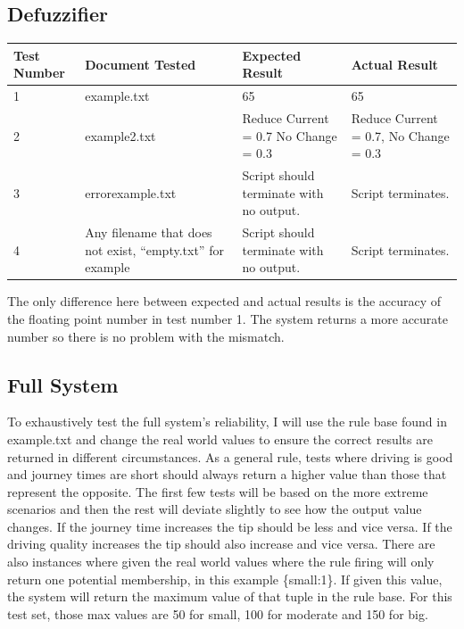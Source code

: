 \documentclass{article}
\begin{document}
\subsection{Defuzzifier}
\begin{center}
 \begin{tabular}{ |p{2cm}|p{3cm}|p{3cm}|p{3cm}|  }
 \hline
 Test Number & Document Tested & Expected Result & Actual Result \\ [0.5ex] 
 \hline\hline
 1 & example.txt & 65 & 65 \\ 
 \hline
 2 & example2.txt & Reduce Current = 0.7 \newline No Change = 0.3 & Reduce Current = 0.7, No Change = 0.3 \\
 \hline
 3 & errorexample.txt & Script should terminate with no output. & Script terminates. \\
 \hline
 4 & Any filename that does not exist, “empty.txt” for example & Script should terminate with no output. & Script terminates. \\
 \hline
\end{tabular}
\end{center}
The only difference here between expected and actual results is the accuracy of the floating point number in test number 1. The system returns a more accurate number so there is no problem with the mismatch.

\subsection{Full System}
To exhaustively test the full system’s reliability, I will use the rule base found in example.txt and change the real world values to ensure the correct results are returned in different circumstances. As a general rule, tests where driving is good and journey times are short should always return a higher value than those that represent the opposite. The first few tests will be based on the more extreme scenarios and then the rest will deviate slightly to see how the output value changes. If the journey time increases the tip should be less and vice versa. If the driving quality increases the tip should also increase and vice versa. There are also instances where given the real world values where the rule firing will only return one potential membership, in this example \{small:1\}. If given this value, the system will return the maximum value of that tuple in the rule base. For this test set, those max values are 50 for small, 100 for moderate and 150 for big.
\end{document}
